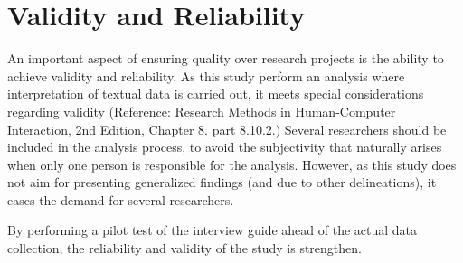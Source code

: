 
\section{Validity and Reliability}

An important aspect of ensuring quality over research projects is the ability to achieve validity and reliability. As this study perform an analysis where interpretation of textual data is carried out, it meets special considerations regarding validity (Reference: Research Methods in Human-Computer Interaction, 2nd Edition, Chapter 8. part 8.10.2.) Several researchers should be included in the analysis process, to avoid the subjectivity that naturally arises when only one person is responsible for the analysis. However, as this study does not aim for presenting generalized findings (and due to other delineations), it eases the demand for several researchers. 

By performing a pilot test of the interview guide ahead of the actual data collection, the reliability and validity of the study is strengthen.






